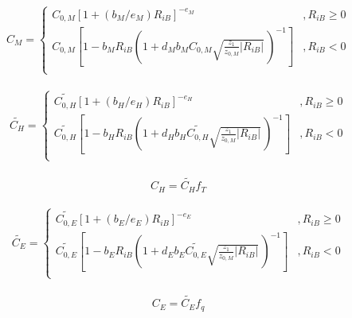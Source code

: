 \begin{itemize}
\begin{eqnarray}
    C_M = \left\{
      \begin{array}{lr}
      C_{0,M} [ 1 + (b_M/e_M)  R_{iB} ]^{-e_M}
            &,
          R_{iB} \geq 0 \\
      C_{0,M} \left[ 1 - b_M R_{iB} \left( 1+ d_M b_M C_{0,M}
                                  \sqrt{\frac{z_1}{z_{0,M}}| R_{iB}|} \,
                                  \right)^{-1} \right]     
          &,
          R_{iB} < 0 \\
      \end{array} \right.
\end{eqnarray}

\begin{eqnarray}
    \widetilde{C_H} = \left\{
      \begin{array}{lr}
      \widetilde{C_{0,H}} [ 1 + (b_H/e_H) R_{iB} ]^{-e_H}
            &,
          R_{iB} \geq 0 \\
      \widetilde{C_{0,H}} \left[ 1 - b_H R_{iB}
                                  \left( 1+ d_H b_H \widetilde{C_{0,H}}
                                  \sqrt{\frac{z_1}{z_{0,M}}| R_{iB}|} \,
                                  \right)^{-1} \right]
             &,     
          R_{iB} < 0 \\
      \end{array} \right.
\end{eqnarray}

\begin{eqnarray}
    C_H = \widetilde{C_H} f_T
\end{eqnarray}

\begin{eqnarray}
    \widetilde{C_E} = \left\{
      \begin{array}{lr}
      \widetilde{C_{0,E}} [ 1 + (b_E/e_E) R_{iB} ]^{-e_E}
            &,
          R_{iB} \geq 0 \\
      \widetilde{C_{0,E}} \left[ 1 - b_E R_{iB}
                                  \left( 1+ d_E b_E \widetilde{C_{0,E}}
                                  \sqrt{\frac{z_1}{z_{0,M}}| R_{iB}|} \,
                                  \right)^{-1} \right]      
          &,
          R_{iB} < 0 \\
      \end{array} \right.
\end{eqnarray}

\begin{eqnarray}
    C_E = \widetilde{C_E} f_q
\end{eqnarray}


\end{itemize}
